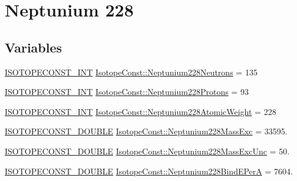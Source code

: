 \hypertarget{group___isotope_const-_neptunium-_np228}{}\section{Neptunium 228}
\label{group___isotope_const-_neptunium-_np228}
\subsection*{Variables}
\begin{DoxyCompactItemize}
\item 
\mbox{\hyperlink{group___isotope_const-_macros_ga5f18360b3e99483a35c32d789e62621c}{I\+S\+O\+T\+O\+P\+E\+C\+O\+N\+S\+T\+\_\+\+I\+NT}} \mbox{\hyperlink{group___isotope_const-_neptunium-_np228_ga8412f49746365c2788bd7dbd66c3da50}{Isotope\+Const\+::\+Neptunium228\+Neutrons}} = 135
\item 
\mbox{\hyperlink{group___isotope_const-_macros_ga5f18360b3e99483a35c32d789e62621c}{I\+S\+O\+T\+O\+P\+E\+C\+O\+N\+S\+T\+\_\+\+I\+NT}} \mbox{\hyperlink{group___isotope_const-_neptunium-_np228_gad42a10ea338e37a020cce2d7ab9047d4}{Isotope\+Const\+::\+Neptunium228\+Protons}} = 93
\item 
\mbox{\hyperlink{group___isotope_const-_macros_ga5f18360b3e99483a35c32d789e62621c}{I\+S\+O\+T\+O\+P\+E\+C\+O\+N\+S\+T\+\_\+\+I\+NT}} \mbox{\hyperlink{group___isotope_const-_neptunium-_np228_ga2ccbfae4b2c36006384cf1d56d08ba66}{Isotope\+Const\+::\+Neptunium228\+Atomic\+Weight}} = 228
\item 
\mbox{\hyperlink{group___isotope_const-_macros_ga8f45a7272ce02c0b4c65c44636ed719a}{I\+S\+O\+T\+O\+P\+E\+C\+O\+N\+S\+T\+\_\+\+D\+O\+U\+B\+LE}} \mbox{\hyperlink{group___isotope_const-_neptunium-_np228_gab103937c5493d8ed38743e595efbba4b}{Isotope\+Const\+::\+Neptunium228\+Mass\+Exc}} = 33595.
\item 
\mbox{\hyperlink{group___isotope_const-_macros_ga8f45a7272ce02c0b4c65c44636ed719a}{I\+S\+O\+T\+O\+P\+E\+C\+O\+N\+S\+T\+\_\+\+D\+O\+U\+B\+LE}} \mbox{\hyperlink{group___isotope_const-_neptunium-_np228_gad227a6a9f9b0473d8f6a043f3ade9d7a}{Isotope\+Const\+::\+Neptunium228\+Mass\+Exc\+Unc}} = 50.
\item 
\mbox{\hyperlink{group___isotope_const-_macros_ga8f45a7272ce02c0b4c65c44636ed719a}{I\+S\+O\+T\+O\+P\+E\+C\+O\+N\+S\+T\+\_\+\+D\+O\+U\+B\+LE}} \mbox{\hyperlink{group___isotope_const-_neptunium-_np228_ga5d242138573e652e495ec3fc38bd2b93}{Isotope\+Const\+::\+Neptunium228\+Bind\+E\+PerA}} = 7604.
\item 

\end{DoxyCompactItemize}
